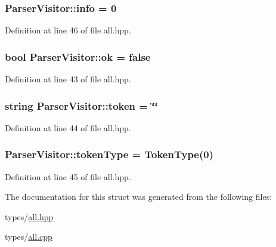 \subsubsection[{info}]{ Parser\+Visitor\+::info = 0\hspace{0.3cm}{\ttfamily [static]}}\label{struct_parser_visitor_a44159efad79cb74d477675367d8dcc3f}


Definition at line 46 of file all.\+hpp.

\hypertarget{struct_parser_visitor_af5c2d247a1ec646aded499e01ca71553}{}
\subsubsection[{ok}]{\setlength{\rightskip}{0pt plus 5cm}bool Parser\+Visitor\+::ok = false\hspace{0.3cm}{\ttfamily [static]}}\label{struct_parser_visitor_af5c2d247a1ec646aded499e01ca71553}


Definition at line 43 of file all.\+hpp.

\hypertarget{struct_parser_visitor_aab2e2f58eb35027426d9e70f78f20169}{}
\subsubsection[{token}]{\setlength{\rightskip}{0pt plus 5cm}string Parser\+Visitor\+::token = \char`\"{}\char`\"{}\hspace{0.3cm}{\ttfamily [static]}}\label{struct_parser_visitor_aab2e2f58eb35027426d9e70f78f20169}


Definition at line 44 of file all.\+hpp.

\hypertarget{struct_parser_visitor_acaa4d8ca1662ec314ae2a8f048f6aca3}{}
\subsubsection[{token\+Type}]{ Parser\+Visitor\+::token\+Type = {\bf Token\+Type}(0)\hspace{0.3cm}{\ttfamily [static]}}\label{struct_parser_visitor_acaa4d8ca1662ec314ae2a8f048f6aca3}


Definition at line 45 of file all.\+hpp.



The documentation for this struct was generated from the following files\+:\begin{DoxyCompactItemize}
\item 
types/\hyperlink{all_8hpp}{all.\+hpp}\item 
types/\hyperlink{all_8cpp}{all.\+cpp}\end{DoxyCompactItemize}
